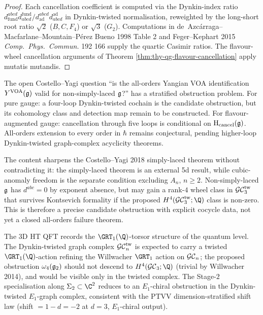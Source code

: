 \begin{proof}
Each cancellation coefficient is computed via the Dynkin-index
ratio $d^{abcd}_{\mathrm{fund}} d_{abcd}^{\mathrm{fund}} /
d^{abcd}_{\mathrm{ad}} d_{abcd}^{\mathrm{ad}}$ in Dynkin-twisted
normalisation, reweighted by the long-short root ratio $\sqrt 2$
($B, C, F_4$) or $\sqrt 3$ ($G_2$). Computations in
de~Azc\'arraga--Macfarlane--Mountain--P\'erez Bueno 1998 Table 2
and Feger--Kephart 2015 \textit{Comp.\ Phys.\ Commun.} 192 166
supply the quartic Casimir ratios. The flavour-wheel cancellation
arguments of Theorem \ref{thm:thy-qg-flavour-cancellation} apply
mutatis mutandis.
\end{proof}

\begin{remark}
\label{rem:thy-qg-non-simply-laced-obstruction}
The open Costello--Yagi question ``is the all-orders Yangian VOA
identification $Y^{\mathrm{VOA}}(\mathfrak g)$ valid for non-simply-laced $\mathfrak g$?'' has a
stratified obstruction problem. For pure gauge: a four-loop
Dynkin-twisted cochain is the candidate obstruction, but its cohomology
class and detection map remain to be constructed. For
flavour-augmented gauge: cancellation through five loops is conditional
on $\mathrm H_{\mathrm{cancel}}(\mathfrak g)$. All-orders extension to every
order in $\hbar$ remains conjectural, pending higher-loop
Dynkin-twisted graph-complex acyclicity theorems.

The content sharpens the Costello--Yagi 2018 simply-laced theorem
without contradicting it: the simply-laced theorem is an external
5d result, while cubic-anomaly freedom is the separate condition
excluding $A_n$, $n\geq2$. Non-simply-laced $\mathfrak g$ has
$d^{abc}=0$ by exponent absence, but may gain a rank-$4$ wheel class
in $\mathcal{GC}^{\mathrm{tw}}_3$ that survives Kontsevich formality if the proposed
$H^4(\GCtw_3;\Q)$ class is non-zero. This is therefore a precise
candidate obstruction with explicit cocycle data, not yet a closed
all-orders failure theorem.
\end{remark}

\begin{remark}
\label{rem:thy-qg-vol-ii-grt-1}
The 3D HT QFT records the $\GRT_1(\Q)$-torsor structure of the
quantum level. The Dynkin-twisted graph complex $\mathcal{GC}^{\mathrm{tw}}_n$ is expected to carry a
twisted $\GRT_1(\Q)$-action refining the Willwacher $\GRT_1$ action
on $\mathcal{GC}_n$; the proposed obstruction $\omega_4(\mathfrak{g}_2)$ should not
descend to $H^4(\GC_3; \Q)$ (trivial by Willwacher 2014), and would be
visible only in the twisted complex. The Stage-$2$ specialisation along $\Sigma_2 \subset
\C^2$ reduces to an $E_1$-chiral obstruction in the Dynkin-twisted
$E_1$-graph complex, consistent with the PTVV dimension-stratified
shift law (shift $= 1 - d = -2$ at $d = 3$, $E_1$-chiral output).
\end{remark}
